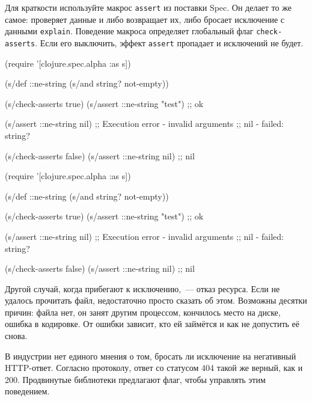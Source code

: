 \fi


Для краткости используйте макрос \verb|assert| из поставки Spec. Он делает то
же самое: проверяет данные и либо возвращает их, либо бросает исключение с
данными \verb|explain|. Поведение макроса определяет глобальный флаг
\verb|check-asserts|. Если его выключить, эффект \verb|assert| пропадает и
исключений не будет.

\ifx\DEVICETYPE\MOBILE

\begin{english}
  \begin{clojure}
(require '[clojure.spec.alpha :as s])

(s/def ::ne-string
  (s/and string? not-empty))

(s/check-asserts true)
(s/assert ::ne-string "test") ;; ok

(s/assert ::ne-string nil)
;; Execution error - invalid arguments
;; nil - failed: string?

(s/check-asserts false)
(s/assert ::ne-string nil) ;; nil
  \end{clojure}
\end{english}

\else

\begin{english}
  \begin{clojure}
(require '[clojure.spec.alpha :as s])

(s/def ::ne-string (s/and string? not-empty))

(s/check-asserts true)
(s/assert ::ne-string "test") ;; ok

(s/assert ::ne-string nil)
;; Execution error - invalid arguments
;; nil - failed: string?

(s/check-asserts false)
(s/assert ::ne-string nil) ;; nil
  \end{clojure}
\end{english}

\fi

Другой случай, когда прибегают к исключению,~--- отказ ресурса. Если не удалось
прочитать файл, недостаточно просто сказать об этом. Возможны десятки причин:
файла нет, он занят другим процессом, кончилось место на диске, ошибка в
кодировке. От ошибки зависит, кто ей займётся и как не допустить её
снова.


В индустрии нет единого мнения о том, бросать ли исключение на негативный
HTTP-ответ. Согласно протоколу, ответ со статусом 404 такой же верный, как и
200. Продвинутые библиотеки предлагают флаг, чтобы управлять этим поведением.

